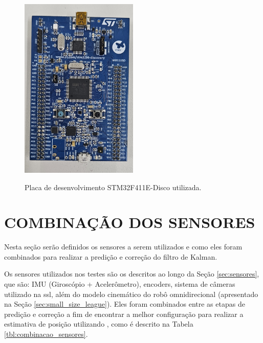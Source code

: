 \documentclass[acronym, symbols, table, deposito]{fei}
\begin{document}
		\begin{figure}[!htb]
			\centering
			\caption{Placa de desenvolvimento STM32F411E-Disco utilizada.}
			\includegraphics[width=0.5\textwidth]{stm32f411.jpg}
			\label{fig:stm32f411}
		\end{figure}
		
	\section{COMBINAÇÃO DOS SENSORES}\label{sec:metodologia_comb_sensores}
	
		Nesta seção serão definidos os sensores a serem utilizados e como eles foram combinados para realizar a predição e correção do filtro de Kalman.
		
		Os sensores utilizados nos testes são os descritos ao longo da Seção \ref{sec:sensores}, que são: IMU (Giroscópio + Acelerômetro), encoders, sistema de câmeras utilizado na \acrshort{ssl}, além do modelo cinemático do robô omnidirecional (apresentado na Seção \ref{sec:small_size_league}). Eles foram combinados entre as etapas de predição e correção a fim de encontrar a melhor configuração para realizar a estimativa de posição utilizando , como é descrito na Tabela \ref{tbl:combinacao_sensores}.
		
\end{document}
